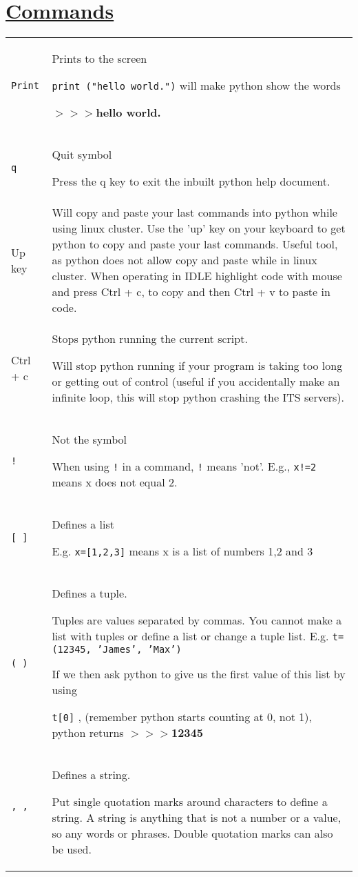 \section*{\underline{Commands}}
\begin{longtable}{l p{11cm}}
\texttt{Print} & Prints to the screen

 \texttt{{\color{purple}print} ("hello world.")} will make python show the words
 
  \textbf{$>>>$hello world.} \\[1ex]
\texttt{q}&Quit symbol

Press the q key to exit the inbuilt python help document.\\[1ex]
Up key & Will copy and paste your last commands into python while using linux cluster.
Use the 'up' key on your keyboard to get python to copy and paste your last commands. Useful tool, as python does not allow copy and paste while in linux cluster. When operating in IDLE highlight code with mouse and press Ctrl + c, to copy and then Ctrl + v to paste in code.\\[1ex]
Ctrl + c & Stops python running the current script.

Will stop python running if your program is taking too long or getting out of control (useful if you accidentally make an infinite loop, this will stop python crashing the ITS servers).\\[1ex]
\texttt{!}& Not the symbol

When using \texttt{!} in a command, \texttt{!} means 'not'. E.g., \texttt{x!=2} means x does not equal 2.\\[1ex]
\texttt{[ ]} & Defines a list

E.g. \texttt{x=[1,2,3]} means x is a list of numbers 1,2 and 3 \\[1ex]
\texttt{( )} & Defines a tuple.

Tuples are values separated by commas. You cannot make a list with tuples or define a list or change a tuple list.
E.g. \texttt{t=(12345, 'James', 'Max')}

If we then ask python to give us the first value of this list by using 

\texttt{t[0]} , (remember python starts counting at 0, not 1), python returns 
\textbf{$>>>$12345}\\[1ex]

\texttt{' '} & Defines a string.

Put single quotation marks around characters to define a string. A string is anything that is not a number or a value, so any words or phrases. Double quotation marks can also be used.\\[1ex]


\end{longtable}
